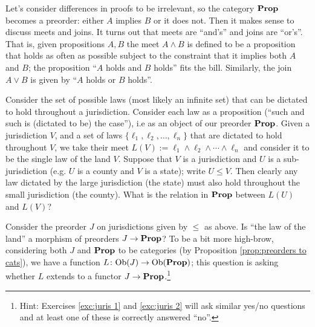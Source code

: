 \documentclass[CT4S-EN-RU]{subfiles}
\begin{document}
\begin{exampleRUS}
\end{exampleRUS}

\begin{blockENG}
Let's consider differences in proofs to be irrelevant, so the category ${\bf Prop}$ becomes a preorder: either $A$ implies $B$ or it does not. Then it makes sense to discuss meets and joins. It turns out that meets are “and's” and joins are “or's”. That is, given propositions $A,B$ the meet $A\wedge B$ is defined to be a proposition that holds as often as possible subject to the constraint that it implies both $A$ and $B$; the proposition “$A$ holds and $B$ holds” fits the bill. Similarly, the join $A\vee B$ is given by “$A$ holds or $B$ holds”.
\end{blockENG}

\begin{blockRUS}
\end{blockRUS}

\begin{exerciseENG}\label{exc:juris 1}
Consider the set of possible laws (most likely an infinite set) that can be dictated to hold throughout a jurisdiction. Consider each law as a proposition (“such and such is (dictated to be) the case”), i.e as an object of our preorder ${\bf Prop}$. Given a jurisdiction $V$, and a set of laws $\{\ell_1,\ell_2,\ldots,\ell_n\}$ that are dictated to hold throughout $V$, we take their meet $L(V):=\ell_1\wedge\ell_2\wedge\cdots\wedge\ell_n$ and consider it to be the single law of the land $V$. Suppose that $V$ is a jurisdiction and $U$ is a sub-jurisdiction (e.g. $U$ is a county and $V$ is a state); write $U\leq V$. Then clearly any law dictated by the large jurisdiction (the state) must also hold throughout the small jurisdiction (the county).
\sexc What is the relation in ${\bf Prop}$ between $L(U)$ and $L(V)$?
\item Consider the preorder $J$ on jurisdictions given by $\leq$ as above. Is “the law of the land” a morphism of preorders $J\rightarrow{\bf Prop}$? To be a bit more high-brow, considering both $J$ and ${\bf Prop}$ to be categories (by Proposition \ref{prop:preorders to cats}), we have a function $L\colon\textnormal{Ob}(J)\rightarrow\textnormal{Ob}({\bf Prop})$; this question is asking whether $L$ extends to a functor $J\rightarrow{\bf Prop}$.\footnote{Hint: Exercises \ref{exc:juris 1} and \ref{exc:juris 2} will ask similar yes/no questions and at least one of these is correctly answered “no”.}
\endsexc
\end{exerciseENG}

\begin{exerciseRUS}\label{exc:juris 1}
\end{exerciseRUS}
\end{document}
